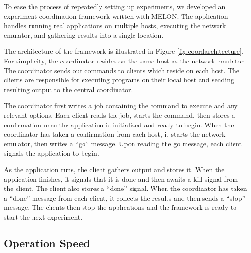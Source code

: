 \documentclass[lnicst]{svmultln}
\begin{document}
To ease the process of repeatedly setting up experiments, we developed an experiment coordination framework written with MELON. The application handles running real applications on multiple hosts, executing the network emulator, and gathering results into a single location.

The architecture of the framework is illustrated in Figure \ref{fig:coordarchitecture}. For simplicity, the coordinator resides on the same host as the network emulator. The coordinator sends out commands to clients which reside on each host. The clients are responsible for executing programs on their local host and sending resulting output to the central coordinator.

The coordinator first writes a job containing the command to execute and any relevant options. Each client reads the job, starts the command, then stores a confirmation once the application is initialized and ready to begin. When the coordinator has taken a confirmation from each host, it starts the network emulator, then writes a ``go'' message. Upon reading the go message, each client signals the application to begin.

As the application runs, the client gathers output and stores it. When the application finishes, it signals that it is done and then awaits a kill signal from the client. The client also stores a ``done'' signal. When the coordinator has taken a ``done'' message from each client, it collects the results and then sends a ``stop'' message. The clients then stop the applications and the framework is ready to start the next experiment.

\subsection{Operation Speed}
\end{document}
